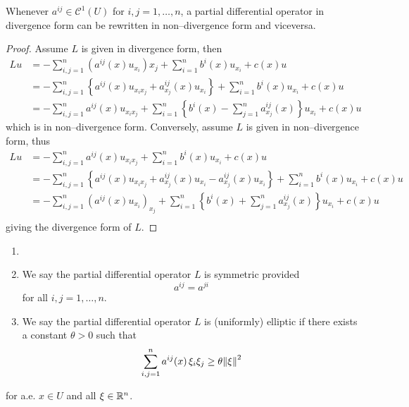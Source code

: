 \begin{prop}
	Whenever $a^{ij} \in \mathcal{C}^1(U)$ for $i, j = 1, \ldots, n$, a partial
	differential operator in divergence form can be rewritten in non--divergence
	form and viceversa.
\end{prop}
\begin{proof}
	Assume $L$ is given in divergence form, then
	\begin{align*}
		L u &= -\sum_{i,j=1}^n (a^{ij}(x) u_{x_i})x_j + \sum_{i=1}^n b^i(x) u_{x_i} + c(x) u \\
		&=
		-\sum_{i,j=1}^n \left\{ a^{ij}(x) u_{x_i x_j} + a_{x_j}^{ij}(x) u_{x_i} \right\} + \sum_{i=1}^n b^i(x) u_{x_i} + c(x) u \\
		&= 
		-\sum_{i,j=1}^na^{ij}(x) u_{x_i x_j} + \sum_{i=1}^n \left\{ b^i(x) - \sum_{j=1}^n a_{x_j}^{ij}(x) \right\} u_{x_i} + c(x) u
	\end{align*}
	which is in non--divergence form. Conversely, assume $L$ is given in non--divergence form, thus
	\begin{align*}		
		L u &= - \sum_{i,j=1}^n a^{ij}(x) u_{x_i x_j} + \sum_{i=1}^n b^i(x) u_{x_i} + c(x) u \\
		&=
		- \sum_{i,j=1}^n \left\{ a^{ij}(x) u_{x_i x_j} + a_{x_j}^{ij}(x) u_{x_i} - a_{x_j}^{ij}(x) u_{x_i} \right\}
		+ \sum_{i=1}^n b^i(x) u_{x_i} + c(x) u \\
		&=
		- \sum_{i,j=1}^n (a^{ij}(x) u_{x_i})_{x_j} + \sum_{i=1}^n \left\{ b^i(x) + \sum_{j=1}^n a_{x_j}^{ij}(x) \right\} u_{x_i} + c(x) u \\
	\end{align*}
	giving the divergence form of $L$.
\end{proof}

\begin{definition*}
	\begin{enumerate}[label={(\roman*)}, topsep=0pt]
		\item[]
		\item We say the partial differential operator $L$ is symmetric provided 
		\begin{equation*} \label{eq:operator_L_symmetry}
			a^{ij} = a^{ji}
		\end{equation*}
		for all $i, j = 1, \ldots, n$.
		\item We say the partial differential operator $L$ is (uniformly)
		elliptic if there exists a constant $\theta > 0$ such that
		\begin{equation*} \label{eq:operator_L_uniformly_elliptic}
			\sum_{i,j=1}^n a^{ij}(x) \, \xi_i \xi_j \geq \theta \norm{\xi}^2
		\end{equation*}
	\end{enumerate}
	for a.e. $x \in U$ and all $\xi \in \mathbb{R}^n$.
\end{definition*}

